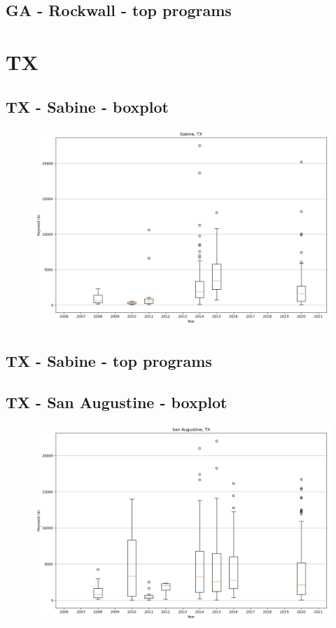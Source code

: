 \subsection*{GA - Rockwall - top programs}

\newpage
\section*{TX}
\subsection*{TX - Sabine - boxplot}
\begin{figure}[h]
\centering
\includegraphics[width=7in]{../output/boxplots/counties/Sabine-TX_boxplot.png}
\end{figure}


\subsection*{TX - Sabine - top programs}

\newpage
\subsection*{TX - San Augustine - boxplot}
\begin{figure}[h]
\centering
\includegraphics[width=7in]{../output/boxplots/counties/San Augustine-TX_boxplot.png}
\end{figure}


